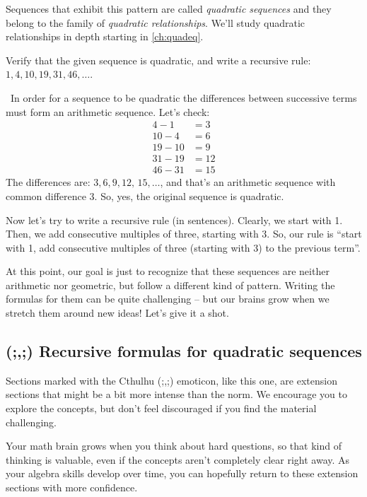 Sequences that exhibit this pattern are called \textit{quadratic sequences} and they belong to the family of \textit{quadratic relationships}. We'll study quadratic relationships in depth starting in \cref{ch:quadeq}.

\begin{boxex}
Verify that the given sequence is quadratic, and write a recursive rule: $1, 4, 10, 19, 31, 46, \dotsc$.

\exsoln\ In order for a sequence to be quadratic the differences between successive terms must form an arithmetic sequence. Let's check:
\[\begin{aligned}
4-1 &= 3\\
10-4 &= 6\\
19-10 &= 9\\
31-19 &= 12\\
46-31 &= 15
\end{aligned}\]
The differences are: $3, 6, 9, 12,\,15, \dotsc$, and that's an arithmetic sequence with common difference 3. So, yes, the original sequence is quadratic.

Now let's try to write a recursive rule (in sentences). Clearly, we start with 1. Then, we add consecutive multiples of three, starting with 3. So, our rule is ``start with 1, add consecutive multiples of three (starting with 3) to the previous term''.
\end{boxex}

At this point, our goal is just to recognize that these sequences are neither arithmetic nor geometric, but follow a different kind of pattern. Writing the formulas for them can be quite challenging -- but our brains grow when we stretch them around new ideas! Let's give it a shot.


\subsection{(;,;) Recursive formulas for quadratic sequences}
%
\begin{tcolorbox}[title={Extension sections}]
Sections marked with the Cthulhu (;,;) emoticon, like this one, are extension sections that might be a bit more intense than the norm. We encourage you to explore the concepts, but don't feel discouraged if you find the material challenging.

Your math brain grows when you think about hard questions, so that kind of thinking is valuable, even if the concepts aren't completely clear right away. As your algebra skills develop over time, you can hopefully return to these extension sections with more confidence.
\end{tcolorbox}

